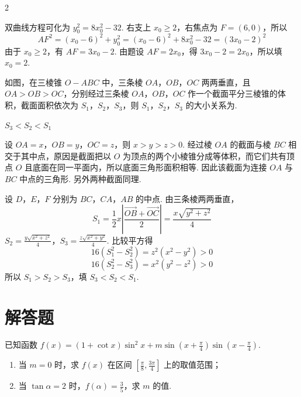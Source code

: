 \begin{answer}
2
\end{answer}

\begin{solution}
双曲线方程可化为 \(y_0^2=8x_0^2-32\). 右支上 \(x_0\geqslant2\)，右焦点为 \(F=(6,0)\)，所以
\[
AF^2=(x_0-6)^2+y_0^2
=(x_0-6)^2+8x_0^2-32
=(3x_0-2)^2
\]
由于 \(x_0\geqslant2\)，有 \(AF=3x_0-2\). 由题设 \(AF=2x_0\)，得 \(3x_0-2=2x_0\)，所以填 \(x_0=2\).
\end{solution}

\begin{problem}
如图，在三棱锥 \(O - ABC\) 中，三条棱 \(OA\)，\(OB\)，\(OC\) 两两垂直，且 \(OA > OB > OC\)，分别经过三条棱 \(OA\)，\(OB\)，\(OC\) 作一个截面平分三棱锥的体积，截面面积依次为 \(S_1\)，\(S_2\)，\(S_3\)，则 \(S_1\)，\(S_2\)，\(S_3\) 的大小关系为\fillinblank{}.

\end{problem}

\begin{answer}
\(S_3 < S_2 < S_1\)
\end{answer}

\begin{solution}
设 \(OA=x\)，\(OB=y\)，\(OC=z\)，则 \(x>y>z>0\). 经过棱 \(OA\) 的截面与棱 \(BC\) 相交于其中点，原因是截面把以 \(O\) 为顶点的两个小棱锥分成等体积，而它们共有顶点 \(O\) 且底面在同一平面内，所以底面三角形面积相等. 因此该截面为连接 \(OA\) 与 \(BC\) 中点的三角形. 另外两种截面同理.

设 \(D\)，\(E\)，\(F\) 分别为 \(BC\)，\(CA\)，\(AB\) 的中点. 由三条棱两两垂直，
\[
S_1=\frac12x\left|\frac{\overrightarrow{OB}+\overrightarrow{OC}}2\right|=\frac{x\sqrt{y^2+z^2}}4
\]
\(S_2=\frac{y\sqrt{x^2+z^2}}4\)，\(S_3=\frac{z\sqrt{x^2+y^2}}4\).
比较平方得
\[
16(S_1^2-S_2^2)=z^2(x^2-y^2)>0
\]
\[
16(S_2^2-S_3^2)=x^2(y^2-z^2)>0
\]
所以 \(S_1>S_2>S_3\)，填 \(S_3<S_2<S_1\).
\end{solution}

\section{解答题}

\begin{problem}
已知函数 \( f(x) = (1 + \cot x)\sin^{2} x + m\sin\left(x + \frac{\pi}{4}\right)\sin\left(x - \frac{\pi}{4}\right) \).

\begin{enumerate}
\item 当 \(m = 0\) 时，求 \(f(x)\) 在区间 \(\left[\frac{\pi}{8}, \frac{3\pi}{4}\right]\) 上的取值范围；
\item 当 \(\tan \alpha = 2\) 时，\(f(\alpha) = \frac{3}{5}\)，求 \(m\) 的值.
\end{enumerate}
\end{problem}


